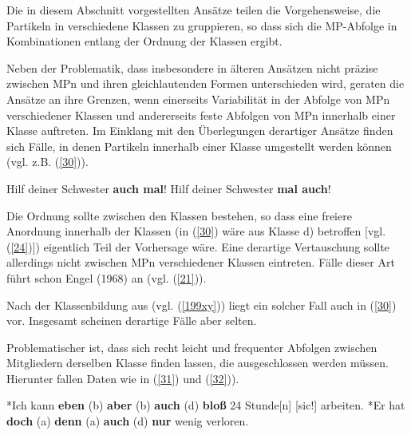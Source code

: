 \noindent
Die in diesem Abschnitt vorgestellten Ansätze teilen die Vorgehensweise, die Partikeln in verschiedene Klassen zu gruppieren, so dass sich die MP-Abfolge in Kombinationen entlang der Ordnung der Klassen ergibt.

Neben der Problematik, dass insbesondere in älteren Ansätzen nicht präzise zwischen MPn und ihren gleichlautenden Formen unterschieden wird, geraten die Ansätze an ihre Grenzen, wenn einerseits Variabilität in der Abfolge von MPn verschiedener Klassen und andererseits feste Abfolgen von MPn innerhalb einer Klasse auftreten. Im Einklang mit den Überlegungen derartiger Ansätze finden sich Fälle, in denen Partikeln innerhalb einer Klasse umgestellt werden können (vgl. z.B. (\ref{30})). 

\begin{exe}
	\ex\label{30} 
		\begin{xlist}	
			\ex\label{30a} Hilf deiner Schwester \textbf{auch mal}!
			\ex\label{30b} Hilf deiner Schwester \textbf{mal auch}!	
			\hfill\hbox {\citet[42]{Helbig1981}}
		\end{xlist}
\end{exe}
Die Ordnung sollte zwischen den Klassen bestehen, so dass eine freiere Anordnung innerhalb der Klassen (in (\ref{30}) wäre aus \citealt{Helbig1981} Klasse d) betroffen [vgl. (\ref{24})]) eigentlich Teil der Vorhersage wäre. Eine derartige Vertauschung sollte allerdings nicht zwischen MPn verschiedener Klassen eintreten. Fälle dieser Art führt schon Engel (1968) an (vgl. (\ref{21})).

Nach der Klassenbildung aus \citet{Thurmair1991} (vgl. (\ref{199xy})) liegt ein solcher Fall auch in (\ref{30}) vor. Insgesamt scheinen derartige Fälle aber selten.

Problematischer ist, dass sich recht leicht und frequenter Abfolgen zwischen Mitgliedern derselben Klasse finden lassen, die ausgeschlossen werden müssen. Hierunter fallen Daten wie in (\ref{31}) und (\ref{32})).

\begin{exe}
	\ex\label{31} 
		\begin{xlist}	
			\ex\label{31a} *Ich kann \textbf{eben} (b) \textbf{aber} (b) \textbf{auch} (d) \textbf{bloß} 24 Stunde[n] [sic!] arbeiten.
			\ex\label{31b} *Er hat \textbf{doch} (a) \textbf{denn} (a) \textbf{auch} (d) \textbf{nur} wenig verloren.
		\end{xlist}
\end{exe}
	
